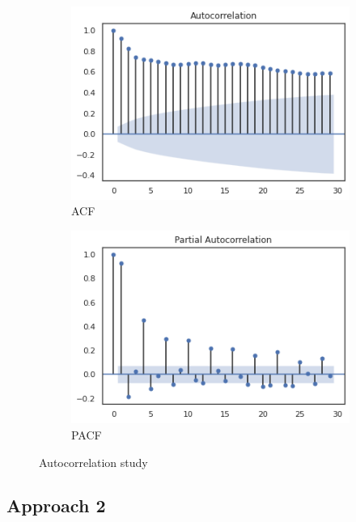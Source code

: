 \begin{figure}[h]
\centering

    \begin{subfigure}{0.49\textwidth}
    \centering
    \includegraphics[width=\linewidth]{figures/Ch4/Trend_autocorr.png}
    \caption{ACF}
    \label{f:auto}
    \end{subfigure}
\hfill
    \begin{subfigure}{0.49\textwidth}
    \centering
    \includegraphics[width=\linewidth]{figures/Ch4/Trend_Partial_autocorr.png}
    \caption{PACF}
    \label{f:partial}
    \end{subfigure}

\caption{Autocorrelation study}
\label{f:autocorrelation}
\end{figure}

\subsection{Approach 2}
\label{s:Approach2}

